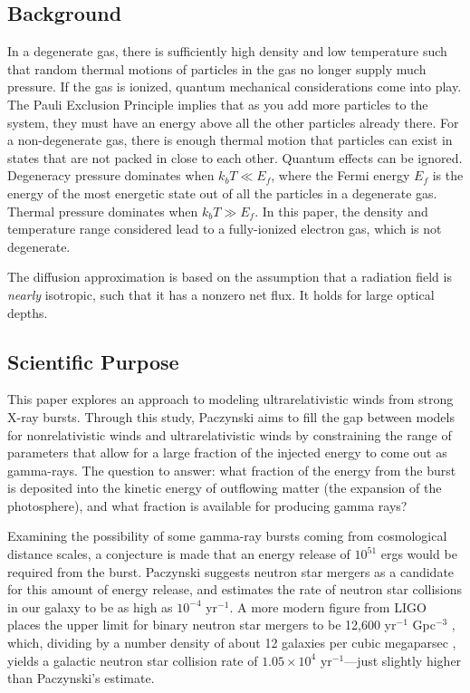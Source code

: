 \documentclass[onecolumn]{aastex63}
\begin{document}
\subsection{Background}
In a degenerate gas, there is sufficiently high density and low temperature such that random thermal motions of particles in the gas no longer supply much pressure. If the gas is ionized, quantum mechanical considerations come into play. The Pauli Exclusion Principle implies that as you add more particles to the system, they must have an energy above all the other particles already there. For a non-degenerate gas, there is enough thermal motion that particles can exist in states that are not packed in close to each other. Quantum effects can be ignored. Degeneracy pressure dominates when $k_b T \ll E_f$, where the Fermi energy $E_f$ is the energy of the most energetic state out of all the particles in a degenerate gas. Thermal pressure dominates when $k_b T \gg E_f$. In this paper, the density and temperature range considered lead to a fully-ionized electron gas, which is not degenerate.

The diffusion approximation is based on the assumption that a radiation field is \textit{nearly} isotropic, such that it has a nonzero net flux. It holds for large optical depths. 

\subsection{Scientific Purpose}
This paper explores an approach to modeling ultrarelativistic winds from strong X-ray bursts. Through this study, Paczynski aims to fill the gap between models for nonrelativistic winds and ultrarelativistic winds by constraining the range of parameters that allow for a large fraction of the injected energy to come out as gamma-rays. The question to answer: what fraction of the energy from the burst is deposited into the kinetic energy of outflowing matter (the expansion of the photosphere), and what fraction is available for producing gamma rays?
        
Examining the possibility of some gamma-ray bursts coming from cosmological distance scales, a conjecture is made that an energy release of $10^{51}$ ergs would be required from the burst. Paczynski suggests neutron star mergers as a candidate for this amount of energy release, and estimates the rate of neutron star collisions in our galaxy to be as high as $10^{-4}$ yr$^{-1}$. A more modern figure from LIGO places the upper limit for binary neutron star mergers to be 12,600 yr$^{-1}$ Gpc$^{-3}$ \citep{ligo}, which, dividing by a number density of about 12 galaxies per cubic megaparsec \citep{fletcher1946}, yields a galactic neutron star collision rate of $1.05 \times 10^4$ yr$^{-1}$---just slightly higher than Paczynski's estimate.
\end{document}
